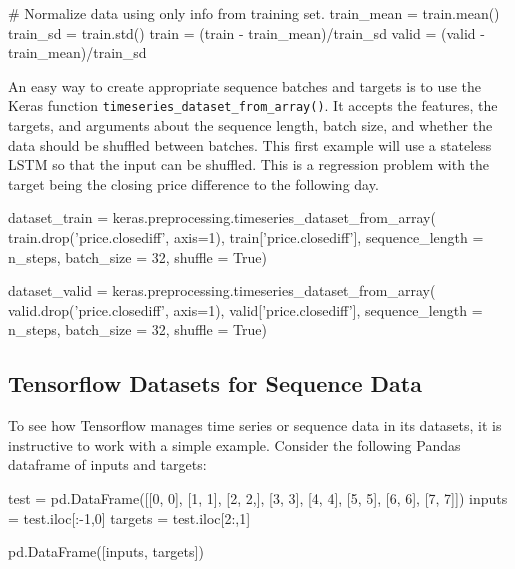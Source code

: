 \begin{samepage}
\begin{pythoncode}
# Normalize data using only info from training set.
train_mean = train.mean()
train_sd = train.std()
train = (train - train_mean)/train_sd
valid = (valid - train_mean)/train_sd
\end{pythoncode}
\end{samepage}

An easy way to create appropriate sequence batches and targets is to use the Keras function \texttt{timeseries\_dataset\_from\_array()}. It accepts the features, the targets, and arguments about the sequence length, batch size, and whether the data should be shuffled between batches. This first example will use a stateless LSTM so that the input can be shuffled. This is a regression problem with the target being the closing price difference to the following day.

\begin{samepage}
\begin{pythoncode}
dataset_train = keras.preprocessing.timeseries_dataset_from_array(
    train.drop('price.closediff', axis=1), 
    train['price.closediff'],
    sequence_length = n_steps,
    batch_size = 32,
    shuffle = True)
\end{pythoncode}
\end{samepage}

\begin{samepage}
\begin{pythoncode}
dataset_valid = keras.preprocessing.timeseries_dataset_from_array(
    valid.drop('price.closediff', axis=1), 
    valid['price.closediff'],
    sequence_length = n_steps,
    batch_size = 32,
    shuffle = True)
\end{pythoncode}
\end{samepage}

\subsection*{Tensorflow Datasets for Sequence Data}

To see how Tensorflow manages time series or sequence data in its datasets, it is instructive to work with a simple example. Consider the following Pandas dataframe of inputs and targets:

\begin{samepage}
\begin{pythoncode}
test = pd.DataFrame([[0, 0], [1, 1], [2, 2,], [3, 3], 
                     [4, 4], [5, 5], [6, 6], [7, 7]]) 
inputs = test.iloc[:-1,0]
targets = test.iloc[2:,1]

pd.DataFrame([inputs, targets])
\end{pythoncode}
\end{samepage}


